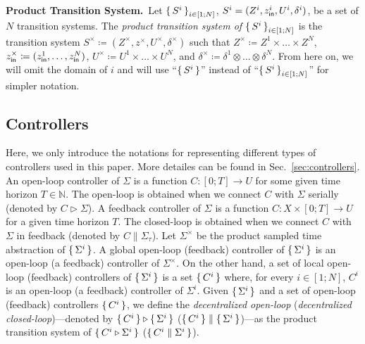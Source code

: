 \smallskip
\noindent\textbf{Product Transition System.}\
Let $\set{S^i}_{i\in [1;N]}$, $S^i=(Z^i,z_{\mathsf{in}}^i,U^i,\delta^i)$, be a set of $N$ transition systems.
The \emph{product transition system of } $\set{S^i}_{i\in [1;N]}$ is the transition system $S^\times \coloneqq (Z^\times, z^\times, U^\times, \delta^\times)$ such that $Z^\times \coloneqq Z^1\times \ldots \times Z^N$, $z^\times_{\mathsf{in}}\coloneqq (z_{\mathsf{in}}^1,\ldots,z_{\mathsf{in}}^N)$, $U^\times \coloneqq U^1\times \ldots\times U^N$, and $\delta^\times \coloneqq \delta^1\otimes\ldots \otimes \delta^N$.
From here on, we will omit the domain of $i$ and will use ``$\set{S^i}$'' instead of ``$\set{S^i}_{i\in [1;N]}$'' for simpler notation.

\subsection{Controllers} Here, we only introduce the notations for representing different types of controllers used in this paper. More detailes can be found in Sec.~\ref{sec:controllers}. %
An open-loop controller of $\Sigma$ is a function $C\colon [0;T]\to U$ for some given time horizon $T\in\mathbb N$. The open-loop is obtained when we connect $C$ with $\Sigma$ serially (denoted by $C \triangleright \Sigma$). %
 A feedback controller of $\Sigma$ is a function $C\colon X\times[0;T]\to U$ for a given time horizon $T$. The closed-loop is obtained when we connect $C$ with $\Sigma$ in feedback (denoted by $C\parallel\Sigma_\tau$). %
Let $\Sigma^\times$ be the product sampled time abstraction of $\set{\Sigma^i} $.
A global open-loop (feedback) controller of $\set{\Sigma^i} $ is an open-loop (a feedback) controller of $\Sigma^\times$.
On the other hand, a set of local open-loop (feedback) controllers of $\set{\Sigma^i} $ is a set $\set{C^i} $ where, for every $i\in [1;N]$, $C^i$ is an open-loop (a feedback) controller of $\Sigma^i$. Given $\set{\Sigma^i} $ and a set of open-loop (feedback) controllers $\set{C^i} $, we define the \emph{decentralized open-loop} (\emph{decentralized closed-loop})---denoted by $\set{C^i} \triangleright \set{\Sigma^i} $ ($\set{C^i} \parallel \set{\Sigma^i} $)---as the product transition system of $\set{C^i\triangleright \Sigma^i} $ ($\set{C^i\parallel \Sigma^i} $).


